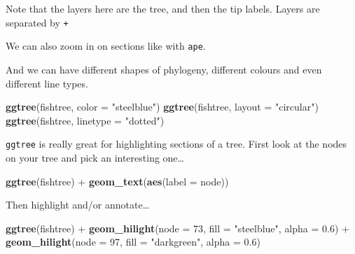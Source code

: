 \documentclass[]{book}
\newenvironment{Shaded}{\begin{snugshade}}{\end{snugshade}}
\newcommand{\KeywordTok}[1]{\textcolor[rgb]{0.13,0.29,0.53}{\textbf{{#1}}}}
\newcommand{\DataTypeTok}[1]{\textcolor[rgb]{0.13,0.29,0.53}{{#1}}}
\newcommand{\DecValTok}[1]{\textcolor[rgb]{0.00,0.00,0.81}{{#1}}}
\newcommand{\FloatTok}[1]{\textcolor[rgb]{0.00,0.00,0.81}{{#1}}}
\newcommand{\StringTok}[1]{\textcolor[rgb]{0.31,0.60,0.02}{{#1}}}
\newcommand{\NormalTok}[1]{{#1}}
\begin{document}
Note that the layers here are the tree, and then the tip labels. Layers
are separated by \texttt{+}

We can also zoom in on sections like with \texttt{ape}.

\begin{Shaded}
\end{Shaded}

And we can have different shapes of phylogeny, different colours and
even different line types.

\begin{Shaded}
\begin{Highlighting}[]
\KeywordTok{ggtree}\NormalTok{(fishtree, }\DataTypeTok{color =} \StringTok{"steelblue"}\NormalTok{)}
\KeywordTok{ggtree}\NormalTok{(fishtree, }\DataTypeTok{layout =} \StringTok{"circular"}\NormalTok{)}
\KeywordTok{ggtree}\NormalTok{(fishtree, }\DataTypeTok{linetype =} \StringTok{"dotted"}\NormalTok{)}
\end{Highlighting}
\end{Shaded}

\texttt{ggtree} is really great for highlighting sections of a tree.
First look at the nodes on your tree and pick an interesting one\ldots{}

\begin{Shaded}
\begin{Highlighting}[]
\KeywordTok{ggtree}\NormalTok{(fishtree) +}\StringTok{ }
\StringTok{  }\KeywordTok{geom_text}\NormalTok{(}\KeywordTok{aes}\NormalTok{(}\DataTypeTok{label =} \NormalTok{node))}
\end{Highlighting}
\end{Shaded}

Then highlight and/or annotate\ldots{}

\begin{Shaded}
\begin{Highlighting}[]
\KeywordTok{ggtree}\NormalTok{(fishtree) +}
\KeywordTok{geom_hilight}\NormalTok{(}\DataTypeTok{node =} \DecValTok{73}\NormalTok{, }\DataTypeTok{fill =} \StringTok{"steelblue"}\NormalTok{, }\DataTypeTok{alpha =} \FloatTok{0.6}\NormalTok{) +}
\KeywordTok{geom_hilight}\NormalTok{(}\DataTypeTok{node =} \DecValTok{97}\NormalTok{, }\DataTypeTok{fill =} \StringTok{"darkgreen"}\NormalTok{, }\DataTypeTok{alpha =} \FloatTok{0.6}\NormalTok{)}
\end{Highlighting}
\end{Shaded}
\end{document}
